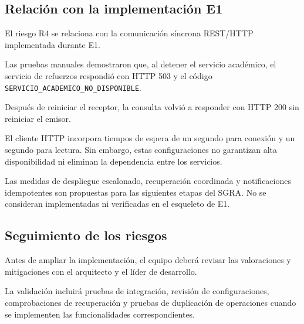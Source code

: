 \subsection{Relación con la implementación E1}

El riesgo R4 se relaciona con la comunicación síncrona REST/HTTP implementada durante E1.

Las pruebas manuales demostraron que, al detener el servicio académico, el servicio de refuerzos respondió con HTTP 503 y el código \texttt{SERVICIO\_ACADEMICO\_NO\_DISPONIBLE}.

Después de reiniciar el receptor, la consulta volvió a responder con HTTP 200 sin reiniciar el emisor.

El cliente HTTP incorpora tiempos de espera de un segundo para conexión y un segundo para lectura. Sin embargo, estas configuraciones no garantizan alta disponibilidad ni eliminan la dependencia entre los servicios.

Las medidas de despliegue escalonado, recuperación coordinada y notificaciones idempotentes son propuestas para las siguientes etapas del SGRA. No se consideran implementadas ni verificadas en el esqueleto de E1.

\subsection{Seguimiento de los riesgos}

Antes de ampliar la implementación, el equipo deberá revisar las valoraciones y mitigaciones con el arquitecto y el líder de desarrollo.

La validación incluirá pruebas de integración, revisión de configuraciones, comprobaciones de recuperación y pruebas de duplicación de operaciones cuando se implementen las funcionalidades correspondientes.

